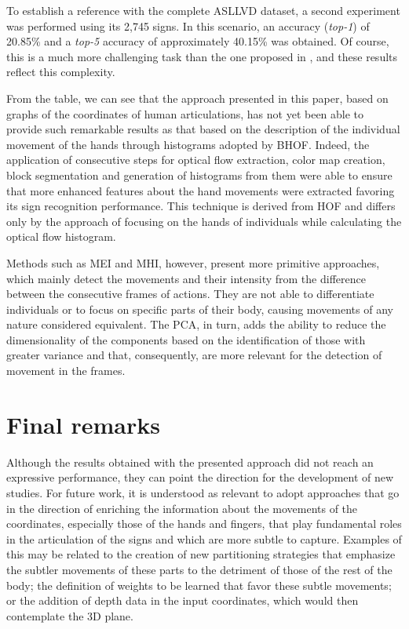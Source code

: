 To establish a reference with the complete ASLLVD dataset, a second experiment was performed using its 2,745 signs. In this scenario, an accuracy (\textit{top-1}) of 20.85\% and a \textit{top-5} accuracy of approximately 40.15\% was obtained. Of course, this is a much more challenging task than the one proposed in \cite{lim-2016}, and these results reflect this complexity.

From the table, we can see that the approach presented in this paper, based on graphs of the coordinates of human articulations, has not yet been able to provide such remarkable results as that based on the description of the individual movement of the hands through histograms adopted by BHOF. Indeed, the application of consecutive steps for optical flow extraction, color map creation, block segmentation and generation of histograms from them were able to ensure that more enhanced features about the hand movements were extracted favoring its sign recognition performance. This technique is derived from HOF and differs only by the approach of focusing on the hands of individuals while calculating the optical flow histogram.

Methods such as MEI and MHI, however, present more primitive approaches, which mainly detect the movements and their intensity from the difference between the consecutive frames of actions. They are not able to differentiate individuals or to focus on specific parts of their body, causing movements of any nature considered equivalent. The PCA, in turn, adds the ability to reduce the dimensionality of the components based on the identification of those with greater variance and that, consequently, are more relevant for the detection of movement in the frames.

\section{Final remarks} 
\label{sec:final-remarks}

Although the results obtained with the presented approach did not reach an expressive performance, they can point the direction for the development of new studies. %
For future work, it is understood as relevant to adopt approaches that go in the direction of enriching the information about the movements of the coordinates, especially those of the hands and fingers, that play fundamental roles in the articulation of the signs and which are more subtle to capture. Examples of this may be related to the creation of new partitioning strategies that emphasize the subtler movements of these parts to the detriment of those of the rest of the body; the definition of weights to be learned that favor these subtle movements; or the addition of depth data in the input coordinates, which would then contemplate the 3D plane.





